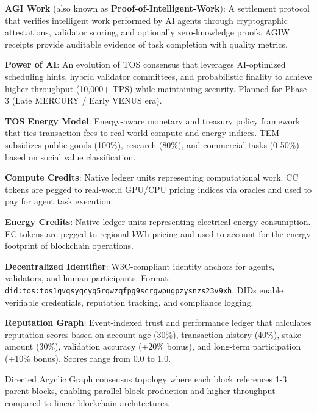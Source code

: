 \documentclass[11pt]{article}
\begin{document}
\begin{description}[leftmargin=3cm, style=nextline]
  \item[AGIW (PoIW)] \textbf{AGI Work} (also known as \textbf{Proof-of-Intelligent-Work}): A settlement protocol that verifies intelligent work performed by AI agents through cryptographic attestations, validator scoring, and optionally zero-knowledge proofs. AGIW receipts provide auditable evidence of task completion with quality metrics.

  \item[PAI] \textbf{Power of AI}: An evolution of TOS consensus that leverages AI-optimized scheduling hints, hybrid validator committees, and probabilistic finality to achieve higher throughput (10,000+ TPS) while maintaining security. Planned for Phase 3 (Late MERCURY / Early VENUS era).

  \item[TEM] \textbf{TOS Energy Model}: Energy-aware monetary and treasury policy framework that ties transaction fees to real-world compute and energy indices. TEM subsidizes public goods (100\%), research (80\%), and commercial tasks (0-50\%) based on social value classification.

  \item[CC] \textbf{Compute Credits}: Native ledger units representing computational work. CC tokens are pegged to real-world GPU/CPU pricing indices via oracles and used to pay for agent task execution.

  \item[EC] \textbf{Energy Credits}: Native ledger units representing electrical energy consumption. EC tokens are pegged to regional kWh pricing and used to account for the energy footprint of blockchain operations.

  \item[DID] \textbf{Decentralized Identifier}: W3C-compliant identity anchors for agents, validators, and human participants. Format: \texttt{did:tos:tos1qvqsyqcyq5rqwzqfpg9scrgwpugpzysnzs23v9xh}. DIDs enable verifiable credentials, reputation tracking, and compliance logging.

  \item[RepGraph] \textbf{Reputation Graph}: Event-indexed trust and performance ledger that calculates reputation scores based on account age (30\%), transaction history (40\%), stake amount (30\%), validation accuracy (+20\% bonus), and long-term participation (+10\% bonus). Scores range from 0.0 to 1.0.

  \item[BlockDAG] Directed Acyclic Graph consensus topology where each block references 1-3 parent blocks, enabling parallel block production and higher throughput compared to linear blockchain architectures.


\end{description}
\end{document}
